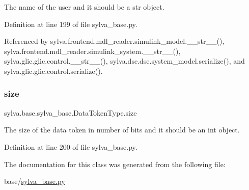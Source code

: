 The name of the user and it should be a str object. 



Definition at line 199 of file sylva\+\_\+base.\+py.



Referenced by sylva.\+frontend.\+mdl\+\_\+reader.\+simulink\+\_\+model.\+\_\+\+\_\+str\+\_\+\+\_\+(), sylva.\+frontend.\+mdl\+\_\+reader.\+simulink\+\_\+system.\+\_\+\+\_\+str\+\_\+\+\_\+(), sylva.\+glic.\+glic.\+control.\+\_\+\+\_\+str\+\_\+\+\_\+(), sylva.\+dse.\+dse.\+system\+\_\+model.\+serialize(), and sylva.\+glic.\+glic.\+control.\+serialize().

\mbox{\label{classsylva_1_1base_1_1sylva__base_1_1_data_token_type_ad2a181eb47ed614abc21072faf2e6849}} 
\subsubsection{\texorpdfstring{size}{size}}
{\footnotesize\ttfamily sylva.\+base.\+sylva\+\_\+base.\+Data\+Token\+Type.\+size}



The size of the data token in number of bits and it should be an int object. 



Definition at line 200 of file sylva\+\_\+base.\+py.



The documentation for this class was generated from the following file\+:\begin{DoxyCompactItemize}
\item 
base/\hyperlink{sylva__base_8py}{sylva\+\_\+base.\+py}\end{DoxyCompactItemize}
